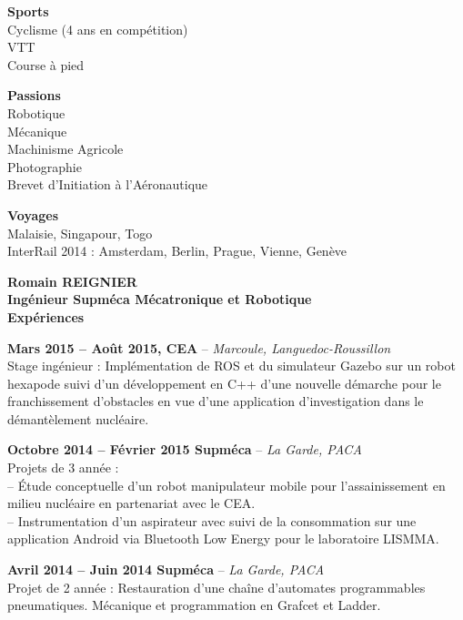 \documentclass[a4paper,11pt,final]{memoir}
\newcommand{\SmallSep}{\vspace{0.5em}}
\newenvironment{AboutMe}
	{\ignorespaces}%
	{\SmallSep\ignorespacesafterend}
\newcommand{\CVSection}[1]
	{\Large\textbf{#1}\par
	\SmallSep\normalsize\normalfont}
\newcommand{\CVItem}[2]
	{\textbf{\color{RoyalBlue} #1 \color{dark_gray} #2}\normalsize\normalfont}
\newcommand{\city}[1]
	{{\small\color{dark_gray}\emph{#1}}\normalsize\normalfont}
\newcommand{\SkillSection}[1]
	{\normalsize{\textbf{#1\\}}\normalfont\small}%
\begin{document}
\begin{flushleft}
\SkillSection{Sports}
Cyclisme (4 ans en compétition)\\
VTT\\
Course à pied\\
\SmallSep

\SkillSection{Passions}
Robotique\\
Mécanique\\
Machinisme Agricole\\
Photographie\\
Brevet d'Initiation à l'Aéronautique
\SmallSep

\SkillSection{Voyages}
Malaisie, Singapour, Togo\\
InterRail 2014 : Amsterdam, Berlin, Prague, Vienne, Genève
\end{flushleft}
\framebreak

\Huge\bfseries {\color{RoyalBlue} Romain REIGNIER} \\
\Large\bfseries  Ingénieur Supméca Mécatronique et Robotique\\


\CVSection{Expériences}

\CVItem{Mars 2015 -- Août 2015,}{CEA} -- \city{Marcoule, Languedoc-Roussillon}\\
Stage ingénieur : Implémentation de ROS et du simulateur Gazebo sur un robot hexapode suivi d'un développement en C++ d'une nouvelle démarche pour le franchissement d'obstacles en vue d'une application d'investigation dans le démantèlement nucléaire.
\SmallSep

\CVItem{Octobre 2014 -- Février 2015}{Supméca} -- \city{La Garde, PACA}\\
Projets de 3\ieme{} année :\\
-- Étude conceptuelle d'un robot manipulateur mobile pour l'assainissement en milieu nucléaire en partenariat avec le CEA.\\
-- Instrumentation d'un aspirateur avec suivi de la consommation sur une application Android via Bluetooth Low Energy pour le laboratoire LISMMA.
\SmallSep

\CVItem{Avril 2014 -- Juin 2014}{Supméca} -- \city{La Garde, PACA}\\
Projet de 2\ieme{} année : Restauration d'une chaîne d'automates programmables pneumatiques. Mécanique et programmation en Grafcet et Ladder.
\SmallSep
\end{document}
